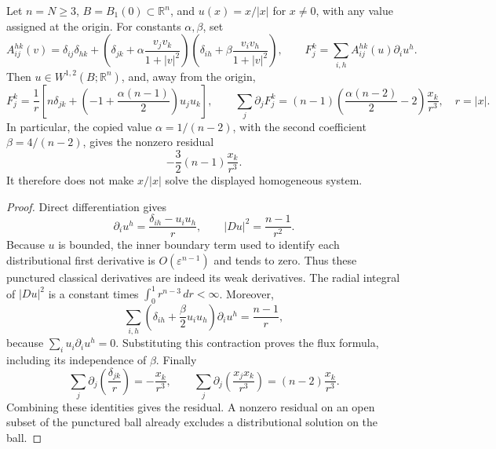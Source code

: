 \begin{proposition}\leavevmode\par\noindent\ours\quad
Let \(n=N\ge3\), \(B=B_1(0)\subset\mathbb R^n\), and \(u(x)=x/|x|\) for \(x\ne0\), with any value assigned at the origin. For constants \(\alpha,\beta\), set
\[
 A_{ij}^{hk}(v)=\delta_{ij}\delta_{hk}
 +\left(\delta_{jk}+\alpha\frac{v_jv_k}{1+|v|^2}\right)
  \left(\delta_{ih}+\beta\frac{v_iv_h}{1+|v|^2}\right),
 \qquad
 F_j^k=\sum_{i,h}A_{ij}^{hk}(u)\partial_i u^h.
\]
Then \(u\in W^{1,2}(B;\mathbb R^n)\), and, away from the origin,
\[
 F_j^k=\frac1r\left[n\delta_{jk}
       +\left(-1+\frac{\alpha(n-1)}2\right)u_ju_k\right],
 \qquad
 \sum_j\partial_jF_j^k
 =(n-1)\left(\frac{\alpha(n-2)}2-2\right)\frac{x_k}{r^3},
 \quad r=|x|.
\]
In particular, the copied value \(\alpha=1/(n-2)\), with the second coefficient \(\beta=4/(n-2)\), gives the nonzero residual
\[
 -\frac32(n-1)\frac{x_k}{r^3}.
\]
It therefore does not make \(x/|x|\) solve the displayed homogeneous system.
\end{proposition}
\begin{proof}
Direct differentiation gives
\[
 \partial_i u^h=\frac{\delta_{ih}-u_i u_h}{r},
 \qquad |Du|^2=\frac{n-1}{r^2}.
\]
Because \(u\) is bounded, the inner boundary term used to identify each distributional first derivative is \(O(\varepsilon^{n-1})\) and tends to zero. Thus these punctured classical derivatives are indeed its weak derivatives. The radial integral of \(|Du|^2\) is a constant times \(\int_0^1r^{n-3}\,dr<\infty\). Moreover,
\[
 \sum_{i,h}\left(\delta_{ih}+\frac\beta2u_i u_h\right)
                    \partial_i u^h=\frac{n-1}{r},
\]
because \(\sum_i u_i\partial_i u^h=0\). Substituting this contraction proves the flux formula, including its independence of \(\beta\). Finally
\[
 \sum_j\partial_j\!\left(\frac{\delta_{jk}}r\right)
 =-\frac{x_k}{r^3},\qquad
 \sum_j\partial_j\!\left(\frac{x_jx_k}{r^3}\right)
 =(n-2)\frac{x_k}{r^3}.
\]
Combining these identities gives the residual. A nonzero residual on an open subset of the punctured ball already excludes a distributional solution on the ball.
\end{proof}

